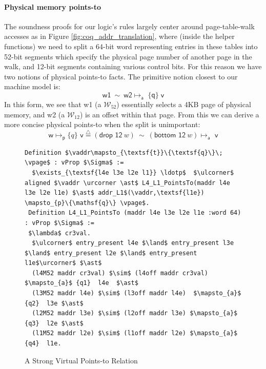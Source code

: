 \paragraph{Physical memory  points-to} The soundness proofs for our logic's rules largely center around page-table-walk accesses as in Figure \ref{fig:coq_addr_translation},
 where (inside the helper functions) we need to split a 64-bit word representing entries in these tables into 52-bit segments
which specify the physical page number of another page in the walk, and 12-bit segments containing various control bits.
For this reason we have two notions of physical points-to facts. The primitive notion closest to our machine model is:
\[ \textsf{w1} \ \sim \ \textsf{w2} \mapsto_{\textsf{a}} \; \{\textsf{q}\} \; \textsf{v} \]
In this form, we see that \textsf{w1} (a $\mathcal{W}_{52}$) essentially selects a 4KB page of physical memory,
and \textsf{w2} (a $\mathcal{W}_{12}$) is an offset within that page.
From this we can derive a more concise physical points-to when the split is unimportant:
\[\textsf{w} \mapsto_{\textsf{p}} \{q\} \textsf{ v} \stackrel{\triangle}{=} (\textsf{drop 12}~w) \ \sim \ (\textsf{bottom 12}~w)\mapsto_{\textsf{a}} \textsf{ v} \]

\begin{figure}
  \begin{lstlisting}[language=Coq]
 Definition $\vaddr\mapsto_{\textsf{t}}\{\textsf{q}\}\; \vpage$ : vProp $\Sigma$ := 
  $\exists_{\textsf{l4e l3e l2e l1}} \ldotp$  $\ulcorner$ aligned $\vaddr \urcorner \ast$ L4_L1_PointsTo(maddr l4e l3e l2e l1e) $\ast$ addr_L1$(\vaddr,\textsf{l1e}) \mapsto_{p}\{\mathsf{q}\} \vpage$.
 Definition L4_L1_PointsTo (maddr l4e l3e l2e l1e :word 64) : vProp $\Sigma$ :=
 $\lambda$ cr3val.
  $\ulcorner$ entry_present l4e $\land$ entry_present l3e $\land$ entry_present l2e $\land$ entry_present l1e$\urcorner$ $\ast$
  (l4M52 maddr cr3val) $\sim$ (l4off maddr cr3val) $\mapsto_{a}$ {q1}  l4e  $\ast$
  (l3M52 maddr l4e) $\sim$ (l3off maddr l4e)  $\mapsto_{a}$ {q2}  l3e $\ast$ 
  (l2M52 maddr l3e) $\sim$ (l2off maddr l3e) $\mapsto_{a}$ {q3}  l2e $\ast$
  (l1M52 maddr l2e) $\sim$ (l1off maddr l2e) $\mapsto_{a}$ {q4}  l1e.
\end{lstlisting}
\vspace{-1em}
\caption{A Strong Virtual Points-to Relation}
  \label{fig:strongvirtualpointsto}
\end{figure}




